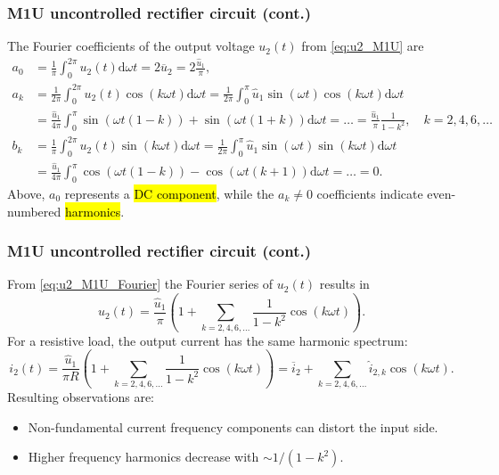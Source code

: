 \begin{frame}
    \frametitle{M1U uncontrolled rectifier circuit (cont.)}
    The Fourier coefficients of the output voltage $u_2(t)$ from \eqref{eq:u2_M1U} are
    \begin{equation}
        \begin{split}
            a_0 &= \frac{1}{\pi} \int_{0}^{2\pi} u_2(t) \mathrm{d} \omega t = 2 \overline{u}_2= 2 \frac{\hat{u}_1}{\pi},\\
            a_k &= \frac{1}{2\pi} \int_{0}^{2\pi} u_2(t) \cos(k\omega t) \mathrm{d}\omega t = \frac{1}{2\pi} \int_{0}^{\pi} \hat{u}_1 \sin(\omega t) \cos(k\omega t) \mathrm{d}\omega t\\  &= \frac{\hat{u}_1}{4\pi} \int_{0}^{\pi}  \sin(\omega t(1-k)) + \sin(\omega t(1+k)) \mathrm{d}\omega t = \ldots =  \frac{\hat{u}_1}{\pi}\frac{1}{1-k^2}, \quad k=2,4,6,\ldots\\
            b_k &= \frac{1}{\pi} \int_{0}^{2\pi} u_2(t) \sin(k\omega t) \mathrm{d}\omega t = \frac{1}{2\pi} \int_{0}^{\pi} \hat{u}_1 \sin(\omega t) \sin(k\omega t) \mathrm{d}\omega t \\ &=\frac{\hat{u}_1}{4\pi} \int_{0}^{\pi}  \cos(\omega t(1-k)) - \cos(\omega t(k+1)) \mathrm{d}\omega t = \ldots = 0.
        \end{split}
        \label{eq:u2_M1U_Fourier}
    \end{equation}
    Above, $a_0$ represents a \hl{DC component}, while the $a_k \neq 0$ coefficients indicate even-numbered \hl{harmonics}.
\end{frame}


\begin{frame}
    \frametitle{M1U uncontrolled rectifier circuit (cont.)}
    From \eqref{eq:u2_M1U_Fourier} the Fourier series of $u_2(t)$ results in
    \begin{equation}
        u_2(t) = \frac{\hat{u}_1}{\pi}\left(1 + \sum_{k=2,4,6,\ldots} \frac{1}{1-k^2} \cos(k\omega t)\right).
    \end{equation}
    For a resistive load, the output current has the same harmonic spectrum:
    \begin{equation}
        i_2(t) = \frac{\hat{u}_1}{\pi R}\left(1 + \sum_{k=2,4,6,\ldots} \frac{1}{1-k^2} \cos(k\omega t)\right) = \overline{i}_2 + \sum_{k=2,4,6,\ldots} \hat{i}_{2,k} \cos(k\omega t).
    \end{equation}
    Resulting observations are:
    \begin{itemize}
        \item Non-fundamental current frequency components can distort the input side.
        \item Higher frequency harmonics decrease with $\sim 1/(1-k^2)$.
    \end{itemize}
\end{frame}

